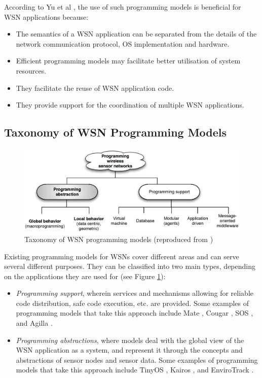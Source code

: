 According to Yu et al \cite{yu_issuesMiddleware:2004}, the use of such
programming models is beneficial for WSN applications because:
\begin{itemize}
\item The semantics of a WSN application can be separated from the details of 
the network communication protocol, OS implementation and hardware.
\item Efficient programming models may facilitate better utilisation of system 
resources.
\item They facilitate the reuse of WSN application code.
\item They provide support for the coordination of multiple WSN applications.
\end{itemize}

\subsection{Taxonomy of WSN Programming Models}

\begin{figure}
\centering
\includegraphics[width=\textwidth]{img/ProgrammingAbstractions.eps} 
\caption[Taxonomy of WSN programming models]{Taxonomy of WSN programming models (reproduced from
\cite{hadim_middleware:2006})}
\label{Fig:ProgrammingModels}
\end{figure}

Existing programming models for WSNs cover different areas and can serve 
several different purposes. They can be classified into two main types, depending on 
the applications they are used for  \cite{hadim_middleware:2006} (see Figure
\ref{Fig:ProgrammingModels}):
\begin{itemize}
\item \emph{Programming support}, wherein services and mechanisms allowing for 
reliable code distribution, safe code execution, etc. are provided. Some
examples of programming models that take this approach include Mate
\cite{Levis_Mate:2002}, Cougar \cite{Bonnet_Cougar:2001}, SOS
\cite{Han_SOS:2005}, and Agilla \cite{Fok_Agilla:2005}.
\item \emph{Programming abstractions}, where models deal with the global view 
of the WSN application as a system, and represent it through the concepts and 
abstractions of sensor nodes and sensor data. Some
examples of programming models that take this approach include TinyOS
\cite{levis_tinyOS:2005}, Kairos \cite{gummadi_Kairos:2005}, and
EnviroTrack \cite{Abdelzaher_EnviroTrack:2004}.
\end{itemize}

